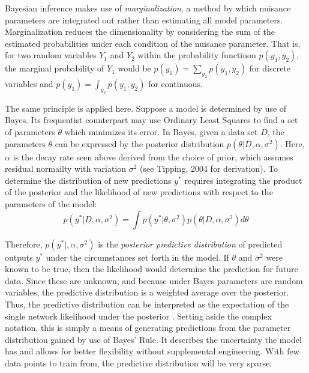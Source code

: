 Bayesian inference makes use of \textit{marginalization}, a method by which nuisance parameters are integrated out rather than estimating all model parameters.
Marginalization reduces the dimensionality by considering the sum of the estimated probabilities under each condition of the nuisance parameter.
That is, for two random variables $Y_1$ and $Y_2$ within the probability functiuon $p(y_1,y_2)$, the marginal probability of $Y_1$ would be 
$ p(y_1) = \sum_{y_2} p(y_1,y_2)$ for discrete variables and $p(y_1) = \int_{y_2} p(y_1,y_2)$ for continuous.
\cite{wackerly2014mathematical}

The same principle is applied here.  Suppose a model is determined by use of Bayes.  Its frequentist counterpart may use Ordinary Least Squares to find a set of parameters $\theta$ which minimizes its error. In Bayes, given a data set $D$, the parameters $\theta$ can be expressed by the posterior distribution $p(\theta|D,\alpha,\sigma^2)$.  Here, $\alpha$ is the decay rate seen above derived from the choice of prior, which assumes residual normailty with variation $\sigma^2$ (see Tipping, 2004 \cite{tipping2004bayesian} for derivation).
To determine the distribution of new predictions $y^*$ requires integrating the product of the posterior and the likelihood of new predictions with respect to the parameters of the model:
$$
p(y^*|D,\alpha,\sigma^2) = \int p(y^*|\theta,\sigma^2) p(\theta|D,\alpha,\sigma^2) d\theta
$$

Therefore, $p(y^*|,\alpha,\sigma^2)$ is the \textit{posterior predictive distribution} of predicted outputs $y^*$ under the circumstances set forth in the model.  If $\theta$ and $\sigma^2$ were known to be true, then the likelihood would determine the prediction for future data.  Since these are unknown, and because under Bayes parameters are random variables, the predictive distribution is a weighted average over the posterior.  Thus, the  predictive distribution can be interpreted as the expectation of the single network likelihood under the posterior \cite{salad} \cite{Jospin}.  
Setting aside the complex notation, this is simply a means of generating predictions from the parameter distribution gained by use of Bayes' Rule.  It describes the uncertainty the model has and allows for better flexibility without supplemental engineering.
With few data points to train from, the predictive distribution will be very sparse. \cite{tipping2004bayesian}

